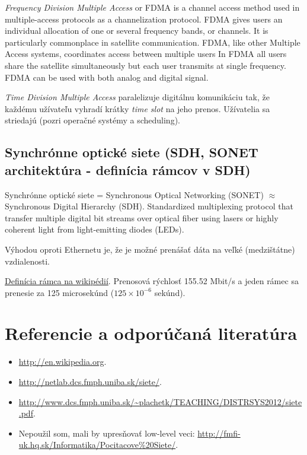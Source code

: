 \documentclass[10pt,a4paper]{article}
\begin{document}
\emph{Frequency Division Multiple Access} or FDMA is a channel access method used in multiple-access protocols as a channelization protocol. FDMA gives users an individual allocation of one or several frequency bands, or channels. It is particularly commonplace in satellite communication. FDMA, like other Multiple Access systems, coordinates access between multiple users
In FDMA all users share the satellite simultaneously but each user transmits at single frequency.
FDMA can be used with both analog and digital signal.
              
\emph{Time Division Multiple Access} paralelizuje digitálnu komunikáciu tak, že každému užívateľu vyhradí krátky \emph{time slot} na jeho prenos. Užívatelia sa striedajú (pozri operačné systémy a scheduling). 
                         
\subsection{Synchrónne optické siete (SDH, SONET architektúra - definícia rámcov v SDH)}
Synchrónne optické siete = Synchronous Optical Networking (SONET) $\approx$ Synchronous Digital Hierarchy (SDH). 
Standardized multiplexing protocol that transfer multiple digital bit streams over optical fiber using lasers or highly coherent light from light-emitting diodes (LEDs).

Výhodou oproti Ethernetu je, že je možné prenášať dáta na veľké (medzištátne) vzdialenosti. 

\href{http://en.wikipedia.org/wiki/Synchronous\_optical\_networking\#SDH_frame}{Definícia rámca na wikipédií}.
Prenosová rýchlosť 155.52 Mbit/s a jeden rámec sa prenesie za 125 microsekúnd ($125 \times 10^{-6}$ sekúnd).


\section{Referencie a odporúčaná literatúra}
\begin{itemize}                                
\item \url{http://en.wikipedia.org}. 
\item \url{http://netlab.dcs.fmph.uniba.sk/siete/}. 
\item \url{http://www.dcs.fmph.uniba.sk/\~plachetk/TEACHING/DISTRSYS2012/siete.pdf}. 
\item Nepoužil som, mali by upresňovať low-level veci: \url{http://fmfi-uk.hq.sk/Informatika/Pocitacove\%20Siete/}.
\end{itemize}
\end{document}
